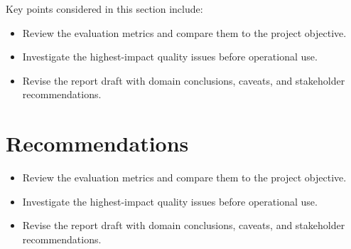 \documentclass[11pt]{article}
\begin{document}
Key points considered in this section include:

\begin{itemize}
\item Review the evaluation metrics and compare them to the project objective.
\item Investigate the highest-impact quality issues before operational use.
\item Revise the report draft with domain conclusions, caveats, and stakeholder recommendations.
\end{itemize}


\section{Recommendations}
\begin{itemize}
\item Review the evaluation metrics and compare them to the project objective.
\item Investigate the highest-impact quality issues before operational use.
\item Revise the report draft with domain conclusions, caveats, and stakeholder recommendations.
\end{itemize}
\end{document}
